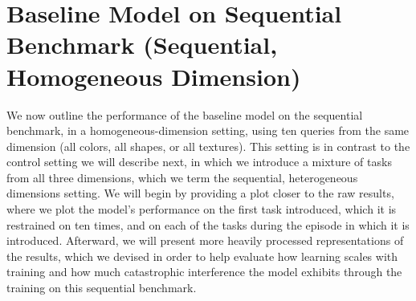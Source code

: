 \FloatBarrier
\section{Baseline Model on Sequential Benchmark (Sequential, Homogeneous Dimension)\label{res:baseline-sequential}}
We now outline the performance of the baseline model on the sequential benchmark, in a homogeneous-dimension setting, using ten queries from the same dimension (all colors, all shapes, or all textures). This setting is in contrast to the control setting we will describe next, in which we introduce a mixture of tasks from all three dimensions, which we term the sequential, heterogeneous dimensions setting. We will begin by providing a plot closer to the raw results, where we plot the model’s performance on the first task introduced, which it is restrained on ten times, and on each of the tasks during the episode in which it is introduced. Afterward, we will present more heavily processed representations of the results, which we devised in order to help evaluate how learning scales with training and how much catastrophic interference the model exhibits through the training on this sequential benchmark. 

